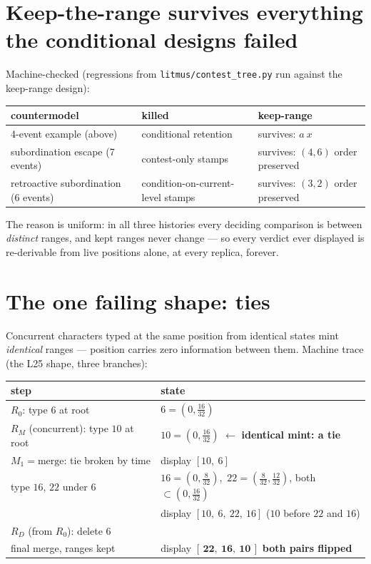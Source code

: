 \documentclass[11pt]{article}
\begin{document}
\section{Keep-the-range survives everything the conditional designs
failed}

Machine-checked (regressions from \texttt{litmus/contest\_tree.py} run
against the keep-range design):

\begin{center}\small
\begin{tabular}{@{}lll@{}}
\toprule
countermodel & killed & keep-range \\
\midrule
4-event example (above) & conditional retention & survives: $a\ x$ \\
subordination escape (7 events) & contest-only stamps & survives:
  $(4,6)$ order preserved \\
retroactive subordination (6 events) & condition-on-current-level stamps
  & survives: $(3,2)$ order preserved \\
\bottomrule
\end{tabular}
\end{center}

\noindent The reason is uniform: in all three histories every deciding
comparison is between \emph{distinct} ranges, and kept ranges never
change --- so every verdict ever displayed is re-derivable from live
positions alone, at every replica, forever.

\section{The one failing shape: ties}

Concurrent characters typed at the same position from identical states
mint \emph{identical} ranges --- position carries zero information
between them. Machine trace (the L25 shape, three branches):

\begin{center}\small
\begin{tabular}{@{}ll@{}}
\toprule
step & state \\
\midrule
$R_0$: type $6$ at root & $6 = (0,\tfrac{16}{32})$ \\
$R_M$ (concurrent): type $10$ at root & $10 = (0,\tfrac{16}{32})$
  \quad$\leftarrow$ \textbf{identical mint: a tie} \\
$M_1 = \mathrm{merge}$: tie broken by time & display $[10,\ 6]$ \\
type $16$, $22$ under $6$ & $16 = (0,\tfrac{8}{32})$,\ $22 =
  (\tfrac{8}{32},\tfrac{12}{32})$, both $\subset (0,\tfrac{16}{32})$ \\
  & display $[10,\ 6,\ 22,\ 16]$ \quad($10$ before $22$ and $16$) \\
$R_D$ (from $R_0$): delete $6$ & \\
final merge, ranges kept & display $[\,\mathbf{22},\ \mathbf{16},\
  \mathbf{10}\,]$ \quad \textbf{both pairs flipped} \\
\bottomrule
\end{tabular}
\end{center}
\end{document}

